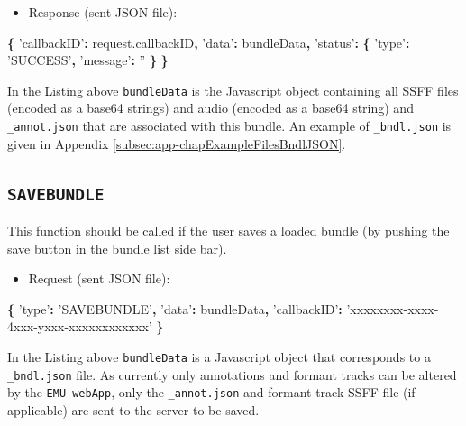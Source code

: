 \documentclass[]{book}
\newenvironment{Shaded}{\begin{snugshade}}{\end{snugshade}}
\newcommand{\AttributeTok}[1]{\textcolor[rgb]{0.77,0.63,0.00}{#1}}
\newcommand{\NormalTok}[1]{#1}
\newcommand{\OperatorTok}[1]{\textcolor[rgb]{0.81,0.36,0.00}{\textbf{#1}}}
\newcommand{\StringTok}[1]{\textcolor[rgb]{0.31,0.60,0.02}{#1}}
\newcommand{\VariableTok}[1]{\textcolor[rgb]{0.00,0.00,0.00}{#1}}
\providecommand{\tightlist}{%
  \setlength{\itemsep}{0pt}\setlength{\parskip}{0pt}}
\theoremstyle{definition}
\theoremstyle{definition}
\theoremstyle{definition}
\theoremstyle{remark}
\begin{document}
\begin{itemize}
\tightlist
\item
  Response (sent JSON file):
\end{itemize}

\begin{Shaded}
\begin{Highlighting}[]
\OperatorTok{\{}
  \StringTok{'callbackID'}\OperatorTok{:} \VariableTok{request}\NormalTok{.}\AttributeTok{callbackID}\OperatorTok{,}
  \StringTok{'data'}\OperatorTok{:}\NormalTok{ bundleData}\OperatorTok{,}
  \StringTok{'status'}\OperatorTok{:} \OperatorTok{\{}
    \StringTok{'type'}\OperatorTok{:} \StringTok{'SUCCESS'}\OperatorTok{,}
    \StringTok{'message'}\OperatorTok{:} \StringTok{''}
  \OperatorTok{\}}
\OperatorTok{\}}
\end{Highlighting}
\end{Shaded}

In the Listing above \texttt{bundleData} is the Javascript object
containing all SSFF files (encoded as a base64 strings) and audio
(encoded as a base64 string) and \texttt{\_annot.json} that are
associated with this bundle. An example of \texttt{\_bndl.json} is given
in Appendix \ref{subsec:app-chapExampleFilesBndlJSON}.

\hypertarget{savebundle}{%
\subsection{\texorpdfstring{\texttt{SAVEBUNDLE}}{SAVEBUNDLE}}\label{savebundle}}

This function should be called if the user saves a loaded bundle (by
pushing the save button in the bundle list side bar).

\begin{itemize}
\tightlist
\item
  Request (sent JSON file):
\end{itemize}

\begin{Shaded}
\begin{Highlighting}[]
\OperatorTok{\{}
  \StringTok{'type'}\OperatorTok{:} \StringTok{'SAVEBUNDLE'}\OperatorTok{,}
  \StringTok{'data'}\OperatorTok{:}\NormalTok{ bundleData}\OperatorTok{,}
  \StringTok{'callbackID'}\OperatorTok{:} \StringTok{'xxxxxxxx-xxxx-4xxx-yxxx-xxxxxxxxxxxx'}
\OperatorTok{\}}
\end{Highlighting}
\end{Shaded}

In the Listing above \texttt{bundleData} is a Javascript object that
corresponds to a \texttt{\_bndl.json} file. As currently only
annotations and formant tracks can be altered by the
\texttt{EMU-webApp}, only the \texttt{\_annot.json} and formant track
SSFF file (if applicable) are sent to the server to be saved.
\end{document}
